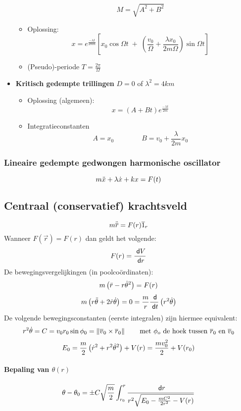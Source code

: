 \begin{itemize}
\begin{itemize}
\[               M = \sqrt{A^2 + B^2}
             \]
       \item Oplossing:
             \[
               x = e^{\frac{-\lambda t}{2mn}} \left[ x_0 \cos \Omega t \; + \; \left(\frac{v_0}{\Omega} + \frac{\lambda x_0}{2m\Omega}\right) \sin \Omega t\right]
             \]
       \item (Pseudo)-periode $T = \frac{2 \pi}{\Omega}$
    \end{itemize}
  \item \textbf{Kritisch gedempte trillingen} $D = 0$ of $\lambda^2 = 4km$
    \begin{itemize}
      \item Oplossing (algemeen):
            \[
              x = \left(A + Bt\right)e^{\frac{-\lambda t}{2m}}
            \]
      \item Integratieconstanten
            \[
              A = x_0
              \qquad \qquad
              B = v_0 + \frac{\lambda}{2m} x_0
            \]
     \end{itemize}
\end{itemize}

\subsubsection{Lineaire gedempte gedwongen harmonische oscillator}
\[
  m\ddot{x} + \lambda \dot{x} + kx  = F(t)
\]

\subsection{Centraal (conservatief) krachtsveld}
\[
   m \ddot{\overline{r}} = F(r) \overline{1}_r
\]
Wanneer $F(\vec{r}) = F(r)$ dan geldt het volgende:
\[
  F(r) = \frac{\;\textsf{d}V}{\;\textsf{d}r}
\]
De bewegingsvergelijkingen (in poolcoördinaten):
\[
  m \left( \ddot{r} - r \dot{\theta}^2\right) = F(r)
\]
\[
  m \left( r \ddot{\theta} + 2 \dot{r} \dot{\theta} \right) = 0 = \frac{m}{r} \frac{\;\textsf{d}}{\;\textsf{d}t}\left(r^2 \dot{\theta} \right)
\]
De volgende bewegingsconstanten (eerste integralen) zijn hiermee equivalent:
\[
  r^2 \dot{\theta} = C = v_0 r_0 \sin \phi_0 = \left\| \overline{v}_0 \times \overline{r}_0 \right\| \qquad \mbox{met $\phi_o$ de hoek tussen $\overline{r}_0$ en $\overline{v}_0$} 
\]
\[
  E_0 = \frac{m}{2} \left( \dot{r}^2 + r^2 \dot{\theta}^2 \right) + V(r) = \frac{mv_0^2}{2} + V(r_0)
\]
\paragraph{Bepaling van $\theta(r)$}
\[
  \theta - \theta_0 = \pm C \sqrt{\frac{m}{2}} \int_{r_0}^{r} \frac{\;\textsf{d}r}{r^2 \sqrt{E_0 - \frac{mC^2}{2r^2} - V(r)}}
\]
